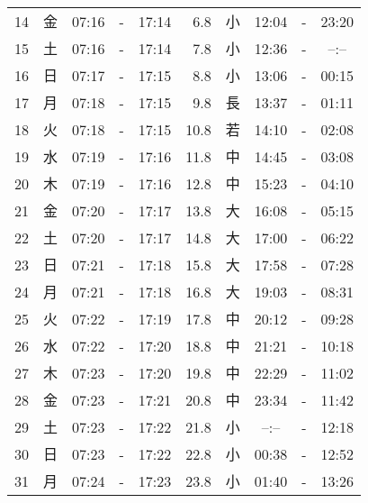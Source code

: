 \documentclass[a4j,10pt]{jsarticle}
\begin{document}
\begin{center}
\begin{table}[ht]
\begin{center}
\begin{tabular}{|rc|ccc|rc|ccc|}
 14 & 金 & 07:16 &-& 17:14 &  6.8 & 小 & 12:04 &-& 23:20 \\
 15 & 土 & 07:16 &-& 17:14 &  7.8 & 小 & 12:36 &-& --:-- \\
 16 & 日 & 07:17 &-& 17:15 &  8.8 & 小 & 13:06 &-& 00:15 \\
 17 & 月 & 07:18 &-& 17:15 &  9.8 & 長 & 13:37 &-& 01:11 \\
 18 & 火 & 07:18 &-& 17:15 & 10.8 & 若 & 14:10 &-& 02:08 \\
 19 & 水 & 07:19 &-& 17:16 & 11.8 & 中 & 14:45 &-& 03:08 \\
 20 & 木 & 07:19 &-& 17:16 & 12.8 & 中 & 15:23 &-& 04:10 \\
 21 & 金 & 07:20 &-& 17:17 & 13.8 & 大 & 16:08 &-& 05:15 \\
 22 & 土 & 07:20 &-& 17:17 & 14.8 & 大 & 17:00 &-& 06:22 \\
 23 & 日 & 07:21 &-& 17:18 & 15.8 & 大 & 17:58 &-& 07:28 \\
 24 & 月 & 07:21 &-& 17:18 & 16.8 & 大 & 19:03 &-& 08:31 \\
 25 & 火 & 07:22 &-& 17:19 & 17.8 & 中 & 20:12 &-& 09:28 \\
 26 & 水 & 07:22 &-& 17:20 & 18.8 & 中 & 21:21 &-& 10:18 \\
 27 & 木 & 07:23 &-& 17:20 & 19.8 & 中 & 22:29 &-& 11:02 \\
 28 & 金 & 07:23 &-& 17:21 & 20.8 & 中 & 23:34 &-& 11:42 \\
 29 & 土 & 07:23 &-& 17:22 & 21.8 & 小 & --:-- &-& 12:18 \\
 30 & 日 & 07:23 &-& 17:22 & 22.8 & 小 & 00:38 &-& 12:52 \\
 31 & 月 & 07:24 &-& 17:23 & 23.8 & 小 & 01:40 &-& 13:26 \\
\hline
\end{tabular}
\end{center}
\end{table}
\newpage
\end{center}
\end{document}
